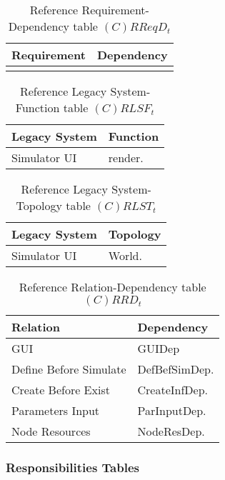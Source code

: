 \begin{table}[H]
	\centering
	\begin{tabular}{|p{4cm}|p{8cm}|}
			\hline
			\textbf{Requirement} & \textbf{Dependency} \\
			\hline
			 & \\
			\hline
		\end{tabular}
		\caption{Reference Requirement-Dependency table $(C)RReqD_t$}
	\label{tab:crreqdt}
\end{table}

\begin{table}[H]
	\centering
	\begin{tabular}{|p{4cm}|p{8cm}|}
			\hline
			\textbf{Legacy System} & \textbf{Function} \\
			\hline
			Simulator UI & render. \\
			\hline
		\end{tabular}
	\caption{Reference Legacy System-Function table $(C)RLSF_t$}
	\label{tab:crlsft}
\end{table}

\begin{table}[H]
	\centering
	\begin{tabular}{|p{4cm}|p{8cm}|}
			\hline
			\textbf{Legacy System} & \textbf{Topology} \\
			\hline
			Simulator UI & World. \\
			\hline
		\end{tabular}
	\caption{Reference Legacy System-Topology table $(C)RLST_t$}
	\label{tab:crlsTt}
\end{table}

\begin{table}[H]
	\centering
	\begin{tabular}{|p{4cm}|p{8cm}|}
			\hline
			\textbf{Relation} & \textbf{Dependency} \\
			\hline
			GUI & GUIDep \\
			\hline
			Define Before Simulate & DefBefSimDep. \\
			\hline
			Create Before Exist & CreateInfDep. \\
			\hline
			Parameters Input & ParInputDep. \\
			\hline
			Node Resources & NodeResDep. \\
			\hline
		\end{tabular}
	\caption{Reference Relation-Dependency table $(C)RRD_t$}
	\label{tab:crrdt}
\end{table}

\subsubsection{Responsibilities Tables}

